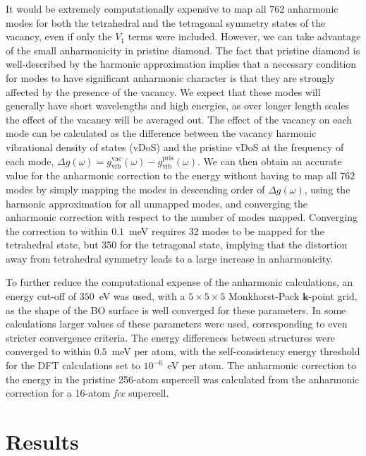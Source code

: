 \documentclass[aps,showpacs,prb,reprint,superscriptaddress,longbibliography]{revtex4-1}
\begin{document}
It would be extremely computationally expensive to map all $762$
anharmonic modes for both the tetrahedral and the tetragonal symmetry
states of the vacancy, even if only the $V_1$ terms were
included. However, we can take advantage of the small anharmonicity in
pristine diamond.\cite{monserrat_anharmonic_2013} The fact that
pristine diamond is well-described by the harmonic approximation
implies that a necessary condition for modes to have significant
anharmonic character is that they are strongly affected by the
presence of the vacancy. We expect that these modes will generally
have short wavelengths and high energies, as over longer length scales
the effect of the vacancy will be averaged out. The effect of the
vacancy on each mode can be calculated as the difference between the
vacancy harmonic vibrational density of states (vDoS) and the pristine
vDoS at the frequency of each mode,
$\Delta g (\omega)=g_\text{vib}^\text{vac} (\omega) -
g_\text{vib}^\text{pris} (\omega)$.
We can then obtain an accurate value for the anharmonic correction to
the energy without having to map all 762 modes by simply mapping the
modes in descending order of $\Delta g (\omega)$, using the harmonic
approximation for all unmapped modes, and converging the anharmonic
correction with respect to the number of modes mapped. Converging the
correction to within $0.1$~meV requires 32 modes to be mapped for the
tetrahedral state, but 350 for the tetragonal state, implying that the
distortion away from tetrahedral symmetry leads to a large increase in
anharmonicity.

To further reduce the computational expense of the anharmonic
calculations, an energy cut-off of $350$~eV was used, with a
$5\times5\times5$ Monkhorst-Pack $\mathbf{k}$-point
grid\cite{monkhorst_special_1976}, as the shape of the BO surface is
well converged for these parameters. In some calculations larger
values of these parameters were used, corresponding to even stricter
convergence criteria. The energy differences between structures were
converged to within $0.5$~meV per atom, with the self-consistency
energy threshold for the DFT calculations set to $10^{-6}$~eV per
atom. The anharmonic correction to the energy in the pristine 256-atom
supercell was calculated from the anharmonic correction for a 16-atom
\textit{fcc} supercell.

\section{Results} \label{sec:results}
\end{document}
